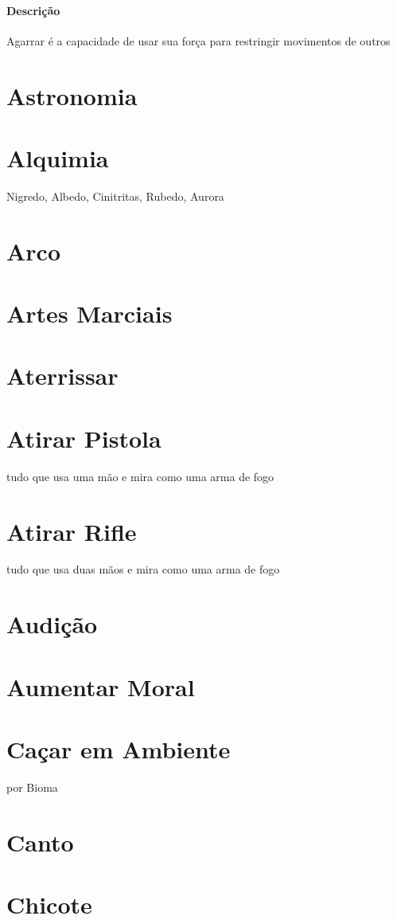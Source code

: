 \paragraph{Descrição}
Agarrar é a capacidade de usar sua força para restringir movimentos de outros
\section{Astronomia}
\section{Alquimia} Nigredo, Albedo, Cinitritas, Rubedo, Aurora%
\section{Arco}
\section{Artes Marciais}%
\section{Aterrissar}
\section{Atirar Pistola} tudo que usa uma mão e mira como uma arma de fogo%
\section{Atirar Rifle} tudo que usa duas mãos e mira como uma arma de fogo%
\section{Audição}
\section{Aumentar Moral}
\section{Caçar em Ambiente} por Bioma
\section{Canto}
\section{Chicote}
